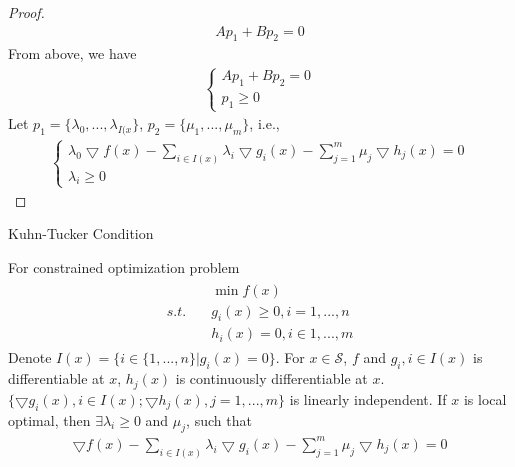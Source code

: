 \begin{proof}
    \begin{align}
        Ap_1 + Bp_2 = 0
    \end{align}
    From above, we have
    \begin{align}
        \left\{
        \begin{array}{ll}
            Ap_1 + Bp_2 = 0 \\
            p_1 \geq 0
        \end{array}
        \right.
    \end{align}
    Let $p_1 = \{\lambda_0,..., \lambda_{I(x}\}$,
    $p_2 = \{\mu_1, ..., \mu_m\}$, i.e.,
    \begin{align}
        \left\{
            \begin{array}{ll}
            \lambda_0 \bigtriangledown f(x) - \sum_{i \in I(x)} \lambda_i
            \bigtriangledown g_i(x) - \sum_{j=1}^m \mu_j
            \bigtriangledown h_j(x) = 0 \\
            \lambda_i \geq 0
            \end{array}
            \right.
    \end{align}
\end{proof}

\begin{theorem}{Kuhn-Tucker Condition}
    \par
    For constrained optimization problem
    \begin{align}
        \begin{array}{lll}
            & \min f(x) \\
            s.t.\quad & g_i(x) \geq 0, i = 1,..., n \\
            & h_i(x) = 0, i \in 1, ..., m
        \end{array}
    \end{align}
    Denote $I(x) = \{i \in \{1,...,n\} | g_i(x) = 0\}$.
    For $x \in \mathcal{S}$, $f$ and $g_i, i \in I(x)$
    is differentiable at $x$, $h_j(x)$ is continuously
    differentiable at $x$.
    $\{\bigtriangledown g_i(x), i \in I(x);\bigtriangledown h_j(x), 
    j = 1,...,m\}$ is linearly independent.
    If $x$ is local optimal, then $\exists \lambda_i \geq 0$
    and $\mu_j$, such that
    \begin{align}
        \bigtriangledown f(x) - \sum_{i \in I(x)} \lambda_i
        \bigtriangledown g_i(x) - \sum_{j=1}^m \mu_j
        \bigtriangledown h_j(x) = 0
    \end{align}
    \label{equ:k-t1}
\end{theorem}

